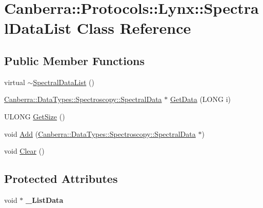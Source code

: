 \hypertarget{class_canberra_1_1_protocols_1_1_lynx_1_1_spectral_data_list}{}\section{Canberra\+:\+:Protocols\+:\+:Lynx\+:\+:Spectral\+Data\+List Class Reference}
\label{class_canberra_1_1_protocols_1_1_lynx_1_1_spectral_data_list}
\subsection*{Public Member Functions}
\begin{DoxyCompactItemize}
\item 
virtual \hyperlink{class_canberra_1_1_protocols_1_1_lynx_1_1_spectral_data_list_a3e1c79e87f5262a94dde963cd0292509_a3e1c79e87f5262a94dde963cd0292509}{$\sim$\+Spectral\+Data\+List} ()
\item 
\hyperlink{class_canberra_1_1_data_types_1_1_spectroscopy_1_1_spectral_data}{Canberra\+::\+Data\+Types\+::\+Spectroscopy\+::\+Spectral\+Data} $\ast$ \hyperlink{class_canberra_1_1_protocols_1_1_lynx_1_1_spectral_data_list_aab442905d6001018402dc21bfa33e0be_aab442905d6001018402dc21bfa33e0be}{Get\+Data} (L\+O\+NG i)
\item 
U\+L\+O\+NG \hyperlink{class_canberra_1_1_protocols_1_1_lynx_1_1_spectral_data_list_a2411e09b14b63fb95d898c82e96552e9_a2411e09b14b63fb95d898c82e96552e9}{Get\+Size} ()
\item 
void \hyperlink{class_canberra_1_1_protocols_1_1_lynx_1_1_spectral_data_list_aa4a5a2fe5aff247a3922ebe1ee3767c4_aa4a5a2fe5aff247a3922ebe1ee3767c4}{Add} (\hyperlink{class_canberra_1_1_data_types_1_1_spectroscopy_1_1_spectral_data}{Canberra\+::\+Data\+Types\+::\+Spectroscopy\+::\+Spectral\+Data} $\ast$)
\item 
void \hyperlink{class_canberra_1_1_protocols_1_1_lynx_1_1_spectral_data_list_a2241de079482e6de9f1364579b1450e6_a2241de079482e6de9f1364579b1450e6}{Clear} ()
\end{DoxyCompactItemize}
\subsection*{Protected Attributes}
\begin{DoxyCompactItemize}
\item 
\mbox{\label{class_canberra_1_1_protocols_1_1_lynx_1_1_spectral_data_list_acfd92390e1047d56f07eed75d41364af}} 
void $\ast$ {\bfseries \+\_\+\+List\+Data}
\end{DoxyCompactItemize}


